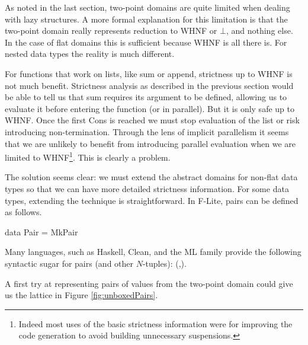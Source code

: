 As noted in the last section, two-point domains are quite limited when dealing
with lazy structures. A more formal explanation for this limitation is that the
two-point domain really represents reduction to WHNF or $\bot$, and nothing
else. In the case of flat domains this is sufficient because WHNF is all there
is. For nested data types the reality is much different. 

For functions that work on lists, like \<sum\> or \<append\>, strictness up to
WHNF is not much benefit. Strictness analysis as described in the previous
section would be able to tell us that \<sum\> requires its argument to be
defined, allowing us to evaluate it before entering the function (or in
parallel). But it is only safe up to WHNF. Once the first \<Cons\> is reached
we must stop evaluation of the list or risk introducing non-termination.
Through the lens of implicit parallelism it seems that we are unlikely to
benefit from introducing parallel evaluation when we are limited to
WHNF\footnote{Indeed most uses of the basic strictness information were for
improving the code generation to avoid building unnecessary suspensions.}. This
is clearly a problem.

The solution seems clear: we must extend the abstract domains for non-flat data
types so that we can have more detailed strictness information. For some data
types, extending the technique is straightforward. In F-Lite, pairs can be
defined as follows.

\begin{haskell*}
data Pair \hasalpha \hasbeta = MkPair \hasalpha \hasbeta
\end{haskell*}

Many languages, such as Haskell, Clean, and the ML family provide the following
syntactic sugar for pairs (and other $N$-tuples): \<(\hasalpha,\hasbeta)\>.

A first try at representing pairs of values from the two-point domain could
give us the lattice in Figure \ref{fig:unboxedPairs}.


